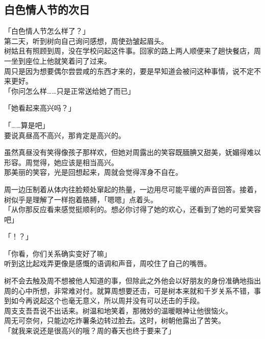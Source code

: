 \subsection{白色情人节的次日}

「白色情人节怎么样了？」\\

第二天，听到树向自己询问感想，周使劲皱起眉头。\\

树姑且有照顾到周，没在学校问起这件事。回家的路上两人顺便来了趟快餐店，周一坐到座位上他就笑着问了过来。\\

周只是因为想要偶尔尝尝咸的东西才来的，要是早知道会被问这种事情，说不定不来更好。\\

「你问怎么样……只是正常送给她了而已」

「她看起来高兴吗？」

「……算是吧」\\

要说真昼高不高兴，那肯定是高兴的。

虽然真昼没有笑得像孩子那样欢，但她对周露出的笑容既腼腆又甜美，妩媚得难以形容。周觉得，她应该是相当高兴。\\

那美丽的笑容，光是回想起来，周就会觉得浑身不自在。

周一边压制着从体内往脸颊处窜起的热量，一边用尽可能平缓的声音回答。接着，树似乎是理解了一样抱着胳膊，「嗯嗯」点着头。\\

「从你那反应看来感觉挺顺利的。想必你讨得了她的欢心，还看到了她的可爱笑容吧」

「！？」

「你看，你们关系确实变好了嘛」\\

听到这比起戏弄更像是感慨的语调和声音，周咬住了自己的嘴唇。

树不会去触及周不想被他人知道的事，但除此之外他会以好朋友的身份准确地指出周的心中所想，非常难对付。就算周想要还击，可是树本来就和千岁关系不错，事到如今再说起这个也毫无意义，所以周并没有可以还击的手段。\\

周支支吾吾说不出话来。树温和地笑着，那微妙的温暖眼神让他很恼火。\\

周无可奈何，只能边吃炸薯条边转过脸去。这时，树朝他露出了苦笑。\\

「就我来说还是很高兴的哦？周的春天也终于要来了」

